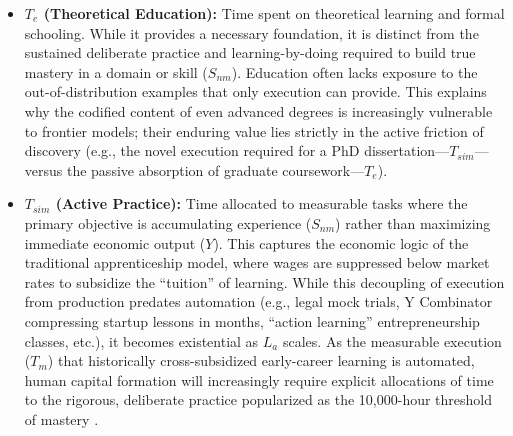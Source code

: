\documentclass[12pt, letter]{article}
\begin{document}
\begin{itemize}
    In our framework, this exogenous ``flexibility gap'' is not a permanent human advantage but an endogenous, retreating technological frontier: as agents leverage world models alongside increasingly advanced data sources ($K_{IP}$) that codify human experience ($S_{nm}$) to adaptively navigate complex environments, tasks requiring deep, flexible expertise today become automated machine execution ($T_m$) tomorrow the moment their feedback loops are digitized into reliable metrics and ground truth \citep{Catalini2025}. At any given technological frontier, this unmeasured residual ($T_{nm}$)---the human time allocated exclusively to steering and verifying agentic labor ($L_a$)---serves as the ultimate binding constraint on safety and trustworthy scaling.

    \item \textbf{$T_e$ (Theoretical Education):} Time spent on theoretical learning and formal schooling. While it provides a necessary foundation, it is distinct from the sustained deliberate practice and learning-by-doing required to build true mastery in a domain or skill ($S_{nm}$). Education often lacks exposure to the out-of-distribution examples that only execution can provide. This explains why the codified content of even advanced degrees is increasingly vulnerable to frontier models; their enduring value lies strictly in the active friction of discovery (e.g., the novel execution required for a PhD dissertation---$T_{sim}$---versus the passive absorption of graduate coursework---$T_e$).

    \item \textbf{$T_{sim}$ (Active Practice):} Time allocated to measurable tasks where the primary objective is accumulating experience ($S_{nm}$) rather than maximizing immediate economic output ($Y$). This captures the economic logic of the traditional apprenticeship model, where wages are suppressed below market rates to subsidize the ``tuition'' of learning. While this decoupling of execution from production predates automation (e.g., legal mock trials, Y Combinator compressing startup lessons in months, ``action learning'' entrepreneurship classes, etc.), it becomes existential as $L_a$ scales. As the measurable execution ($T_m$) that historically cross-subsidized early-career learning is automated, human capital formation will increasingly require explicit allocations of time to the rigorous, deliberate practice popularized as the 10,000-hour threshold of mastery \citep{gladwell2008outliers}.
 
\end{itemize}
\end{document}
